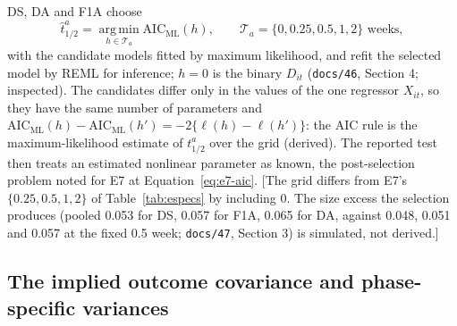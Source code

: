 \documentclass[11pt]{article}
\newcommand{\note}[1]{\textcolor{blue!60!black}{\small [#1]}}
\newcommand{\code}[1]{\texttt{#1}}
\begin{document}
DS, DA and F1A choose
\begin{equation}
\hat t^{a}_{1/2} = \operatorname*{arg\,min}_{h \in \mathcal T_a}
  \mathrm{AIC}_{\mathrm{ML}}(h), \qquad \mathcal T_a = \{0, 0.25, 0.5,
  1, 2\} \text{ weeks},
\label{eq:invd-aic}
\end{equation}
with the candidate models fitted by maximum likelihood, and refit the
selected model by REML for inference; $h = 0$ is the binary $D_{it}$
(\code{docs/46}, Section 4; inspected). The candidates differ only in
the values of the one regressor $X_{it}$, so they have the same number
of parameters and $\mathrm{AIC}_{\mathrm{ML}}(h) - \mathrm{AIC}_{\mathrm{ML}}(h')
= -2\{\ell(h) - \ell(h')\}$: the AIC rule is the maximum-likelihood
estimate of $t^{a}_{1/2}$ over the grid (derived). The reported test
then treats an estimated nonlinear parameter as known, the
post-selection problem noted for E7 at Equation~\eqref{eq:e7-aic}.
\note{The grid differs from E7's $\{0.25, 0.5, 1, 2\}$ of
Table~\ref{tab:especs} by including 0. The size excess the selection
produces (pooled 0.053 for DS, 0.057 for F1A, 0.065 for DA, against
0.048, 0.051 and 0.057 at the fixed 0.5 week; \code{docs/47},
Section 3) is simulated, not derived.}

\subsection{The implied outcome covariance and phase-specific
variances}
\label{sec:invd-phase}
\end{document}
